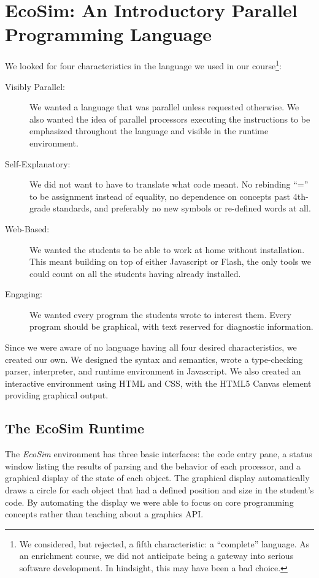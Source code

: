 \documentclass{sig-alternate}
\newcommand{\EcoSim}{\emph{EcoSim}}
\begin{document}
\section{EcoSim: An Introductory Parallel Programming Language}
We looked for four characteristics in the language we used in our course\footnote{
We considered, but rejected, a fifth characteristic: a ``complete'' language.
As an enrichment course, we did not anticipate being a gateway into serious software development.
In hindsight, this may have been a bad choice.
}:
\begin{description}
	\item[Visibly Parallel:]
		We wanted a language that was parallel unless requested otherwise.
		We also wanted the idea of parallel processors executing the instructions
		to be emphasized throughout the language and visible in the runtime environment.
	\item[Self-Explanatory:]
		We did not want to have to translate what code meant.
		No rebinding ``='' to be assignment instead of equality,
		no dependence on concepts past 4th-grade standards,
		and preferably no new symbols or re-defined words at all.
	\item[Web-Based:]
		We wanted the students to be able to work at home without installation.
		This meant building on top of either Javascript or Flash, 
		the only tools we could count on all the students having already installed.
	\item[Engaging:]
		We wanted every program the students wrote to interest them.
		Every program should be graphical, with text reserved for diagnostic information.
\end{description}

Since we were aware of no language having all four desired characteristics, 
we created our own.
We designed the syntax and semantics, 
wrote a type-checking parser, interpreter, and runtime environment in Javascript.
We also created an interactive environment using HTML and CSS, with the HTML5 Canvas element providing graphical output.

\subsection{The EcoSim Runtime}\label{sec:runtime}
The \EcoSim{} environment has three basic interfaces:
the code entry pane, 
a status window listing the results of parsing and the behavior of each processor,
and a graphical display of the state of each object.
The graphical display automatically draws a circle for each object
that had a defined position and size in the student's code.
By automating the display 
we were able to focus on core programming concepts
rather than teaching about a graphics API.
\end{document}
